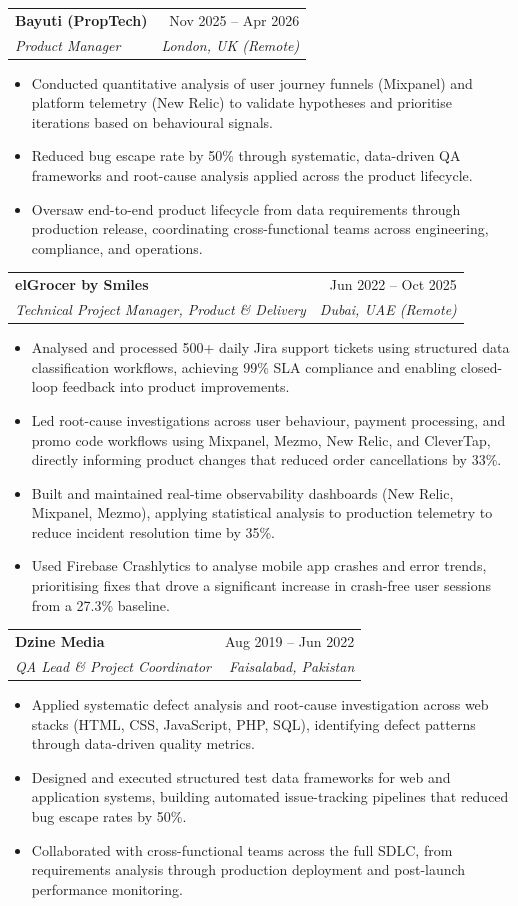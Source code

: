 \documentclass[letterpaper,10pt]{article}
\makeatletter
\newcommand{\resumeItem}[1]{
  \item\small{
    {#1 \vspace{-2pt}}
  }
}
\newcommand{\resumeSubheading}[4]{
  \vspace{-2pt}\item
    \begin{tabular*}{0.97\textwidth}[t]{l@{\extracolsep{\fill}}r}
      \textbf{#1} & #2 \\
      \textit{\small#3} & \textit{\small #4} \\
    \end{tabular*}\vspace{-7pt}
}
\newcommand{\resumeItemListStart}{\begin{itemize}[leftmargin=0.15in]}
\newcommand{\resumeItemListEnd}{\end{itemize}\vspace{-5pt}}
\makeatother
\begin{document}
    \resumeSubheading
      {Bayuti (PropTech)}{Nov 2025 – Apr 2026}
      {Product Manager}{London, UK (Remote)}
      \resumeItemListStart
        \resumeItem{Conducted quantitative analysis of user journey funnels (Mixpanel) and platform telemetry (New Relic) to validate hypotheses and prioritise iterations based on behavioural signals.}
        \resumeItem{Reduced bug escape rate by 50\% through systematic, data-driven QA frameworks and root-cause analysis applied across the product lifecycle.}
        \resumeItem{Oversaw end-to-end product lifecycle from data requirements through production release, coordinating cross-functional teams across engineering, compliance, and operations.}
      \resumeItemListEnd

    \resumeSubheading
      {elGrocer by Smiles}{Jun 2022 – Oct 2025}
      {Technical Project Manager, Product \& Delivery}{Dubai, UAE (Remote)}
      \resumeItemListStart
        \resumeItem{Analysed and processed 500+ daily Jira support tickets using structured data classification workflows, achieving 99\% SLA compliance and enabling closed-loop feedback into product improvements.}
        \resumeItem{Led root-cause investigations across user behaviour, payment processing, and promo code workflows using Mixpanel, Mezmo, New Relic, and CleverTap, directly informing product changes that reduced order cancellations by 33\%.}
        \resumeItem{Built and maintained real-time observability dashboards (New Relic, Mixpanel, Mezmo), applying statistical analysis to production telemetry to reduce incident resolution time by 35\%.}
        \resumeItem{Used Firebase Crashlytics to analyse mobile app crashes and error trends, prioritising fixes that drove a significant increase in crash-free user sessions from a 27.3\% baseline.}
      \resumeItemListEnd

    \resumeSubheading
      {Dzine Media}{Aug 2019 – Jun 2022}
      {QA Lead \& Project Coordinator}{Faisalabad, Pakistan}
      \resumeItemListStart
        \resumeItem{Applied systematic defect analysis and root-cause investigation across web stacks (HTML, CSS, JavaScript, PHP, SQL), identifying defect patterns through data-driven quality metrics.}
        \resumeItem{Designed and executed structured test data frameworks for web and application systems, building automated issue-tracking pipelines that reduced bug escape rates by 50\%.}
        \resumeItem{Collaborated with cross-functional teams across the full SDLC, from requirements analysis through production deployment and post-launch performance monitoring.}
      \resumeItemListEnd
\end{document}
